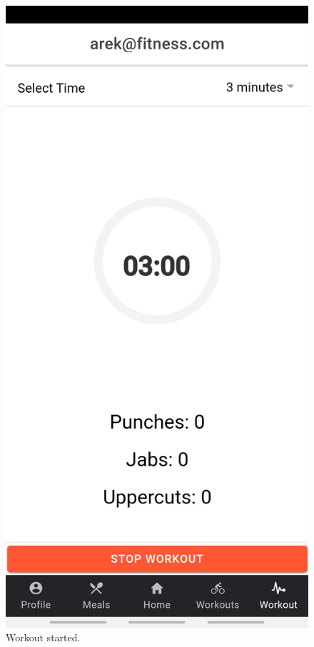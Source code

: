\documentclass[a4paper,12pt]{report}
\begin{document}
\begin{figure}[ht]
\begin{minipage}[b]{0.5\linewidth}
    \includegraphics[width=.7\linewidth]{images/aplicationImages/startWorkout.jpeg} 
    \caption{Workout started.} 
    \vspace{4ex}
  \end{minipage}
\end{figure}
\end{document}
